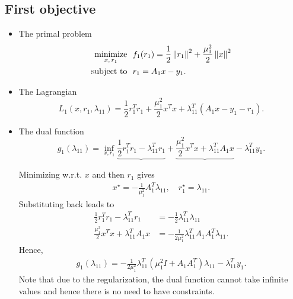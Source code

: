 \documentclass[12pt]{article}
\begin{document}
\subsection{First objective}

\begin{itemize}

\item The primal problem
  \begin{align}
    \begin{split}
      \mathop{\mbox{minimize}}_{x, \, r_1} \ \  & f_1(r_1) = \frac{1}{2}\left\lVert r_1\right\rVert^2 + \frac{\mu_1^2}{2}\left\lVert x\right\rVert^2\\
      \mbox{subject to} \ \  & r_1 = A_1x - y_1.
    \end{split}
  \end{align}

\item The Lagrangian
  \[
  L_1(x,r_1,\lambda_{11}) = \frac{1}{2}r_1^Tr_1 + \frac{\mu_1^2}{2} x^Tx + \lambda_{11}^T(A_1x - y_1 - r_1).
  \]

\item The dual function
%
\[
g_1(\lambda_{11}) = \inf_{x,r_1} \underbrace{\frac{1}{2}r_1^Tr_1 - \lambda_{11}^Tr_1} +
\underbrace{\frac{\mu_1^2}{2}x^Tx + \lambda_{11}^TA_1x} - \lambda_{11}^Ty_1.
\]

Minimizing w.r.t. $x$ and then $r_1$ gives
%
\begin{align} \label{eq.x_r}
x^{\star} = -\frac{1}{\mu_1^2}A_1^T\lambda_{11}, \quad r_1^{\star} = \lambda_{11}.
\end{align}
%
Substituting back leads to
%
\begin{align}
\frac{1}{2}r_1^Tr_1 - \lambda_{11}^Tr_1 &= -\frac{1}{2}\lambda_{11}^T\lambda_{11} \\
\frac{\mu_1^2}{2} x^Tx + \lambda_{11}^TA_1x &= -\frac{1}{2\mu_1^2} \lambda_{11}^T A_1A_1^T \lambda_{11}.
\end{align}
%
Hence,
%
\begin{align}
g_1(\lambda_{11}) = -\frac{1}{2\mu_1^2}\lambda_{11}^T\left(\mu_1^2I+A_1A_1^T\right)\lambda_{11} - \lambda_{11}^Ty_1.
\end{align}
%
Note that due to the regularization, the dual function cannot take infinite values and hence there
is no need to have constraints.


\end{itemize}
\end{document}
